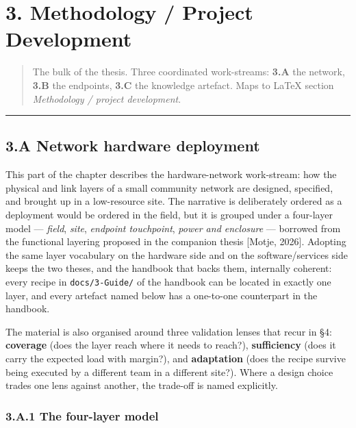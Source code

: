 \hypertarget{methodology-project-development}{%
\section{3. Methodology / Project
Development}\label{methodology-project-development}}

\begin{quote}
The bulk of the thesis. Three coordinated work-streams: \textbf{3.A} the
network, \textbf{3.B} the endpoints, \textbf{3.C} the knowledge
artefact. Maps to LaTeX section \emph{Methodology / project
development}.
\end{quote}

\begin{center}\rule{0.5\linewidth}{0.5pt}\end{center}

\hypertarget{a-network-hardware-deployment}{%
\subsection{3.A Network hardware
deployment}\label{a-network-hardware-deployment}}

This part of the chapter describes the hardware-network work-stream: how
the physical and link layers of a small community network are designed,
specified, and brought up in a low-resource site. The narrative is
deliberately ordered as a deployment would be ordered in the field, but
it is grouped under a four-layer model --- \emph{field}, \emph{site},
\emph{endpoint touchpoint}, \emph{power and enclosure} --- borrowed from
the functional layering proposed in the companion thesis {[}Motje,
2026{]}. Adopting the same layer vocabulary on the hardware side and on
the software/services side keeps the two theses, and the handbook that
backs them, internally coherent: every recipe in \texttt{docs/3-Guide/}
of the handbook can be located in exactly one layer, and every artefact
named below has a one-to-one counterpart in the handbook.

The material is also organised around three validation lenses that recur
in §4: \textbf{coverage} (does the layer reach where it needs to
reach?), \textbf{sufficiency} (does it carry the expected load with
margin?), and \textbf{adaptation} (does the recipe survive being
executed by a different team in a different site?). Where a design
choice trades one lens against another, the trade-off is named
explicitly.

\hypertarget{a.1-the-four-layer-model}{%
\subsubsection{3.A.1 The four-layer
model}\label{a.1-the-four-layer-model}}

